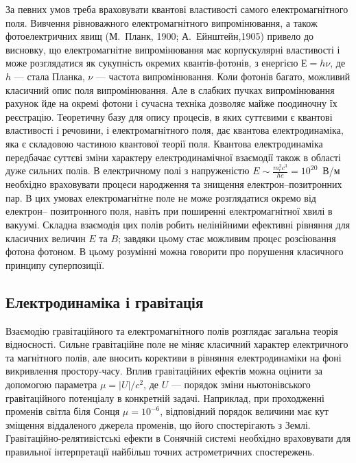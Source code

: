 За певних умов треба враховувати квантові властивості самого електромагнітного поля. Вивчення рівноважного електромагнітного випромінювання, а також
фотоелектричних явищ (М.~Планк, 1900; А.~Ейнштейн,1905) привело до висновку, що електромагнітне випромінювання має корпускулярні властивості і може
розглядатися як сукупність окремих квантів-фотонів, з енергією $Е=h\nu$, де $h$ --- стала Планка, $\nu$ --- частота випромінювання. Коли фотонів багато,
можливий класичний опис поля випромінювання. Але в слабких пучках випромінювання рахунок йде на окремі фотони і сучасна техніка дозволяє майже
поодиночну їх реєстрацію. Теоретичну базу для опису процесів, в яких суттєвими є квантові властивості і речовини, і електромагнітного поля, дає квантова
електродинаміка, яка є складовою частиною квантової теорії поля. Квантова електродинаміка передбачає суттєві зміни характеру електродинамічної взаємодії
також в області дуже сильних полів. В електричному полі з напруженістю $E \sim \frac{m_e^2 c^3}{he} = 10^{20}$~В/м необхідно враховувати процеси
народження та знищення електрон–позитронних пар. В цих умовах електромагнітне поле не може розглядатися окремо від електрон–
позитронного поля, навіть
при поширенні електромагнітної хвилі в вакуумі. Складна взаємодія цих полів робить нелінійними ефективні рівняння для класичних величин $E$ та $B$;
завдяки цьому стає можливим процес розсіювання фотона фотоном. В цьому розумінні можна говорити про порушення класичного принципу суперпозиції.



\subsection*{Електродинаміка і гравітація}

Взаємодію гравітаційного та електромагнітного полів розглядає загальна
теорія відносності. Сильне гравітаційне поле не міняє класичний характер
електричного та магнітного полів, але вносить корективи в рівняння
електродинаміки на фоні викривлення простору-часу. Вплив гравітаційних
ефектів можна оцінити за допомогою параметра $\mu = |U|/c^2$, де $U$ --- порядок
зміни ньютонівського гравітаційного потенціалу в конкретній задачі.
Наприклад, при проходженні променів світла біля Сонця $\mu = 10^{-6}$, відповідний
порядок величини має кут зміщення віддаленого джерела променів, що його
спостерігають з Землі. Гравітаційно-релятивістські ефекти в Сонячній системі
необхідно враховувати для правильної інтерпретації найбільш точних
астрометричних спостережень.


